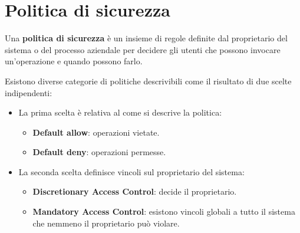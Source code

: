 \section{Politica di sicurezza}
Una \textbf{politica di sicurezza} è un insieme di regole definite dal proprietario del sistema o del processo
aziendale per decidere gli utenti che possono invocare un'operazione e quando possono farlo.

Esistono diverse categorie di politiche descrivibili come il risultato di due scelte indipendenti:
\begin{itemize}
	\item La prima scelta è relativa al come si descrive la politica:
	      \begin{itemize}
		      \item \textbf{Default allow}: operazioni vietate.
		      \item \textbf{Default deny}: operazioni permesse.
	      \end{itemize}
	\item La seconda scelta definisce vincoli sul proprietario del sistema:
	      \begin{itemize}
		      \item \textbf{Discretionary Access Control}: decide il proprietario.
		      \item \textbf{Mandatory Access Control}: esistono vincoli globali a tutto il sistema che nemmeno il
		            proprietario può violare.
	      \end{itemize}
\end{itemize}
